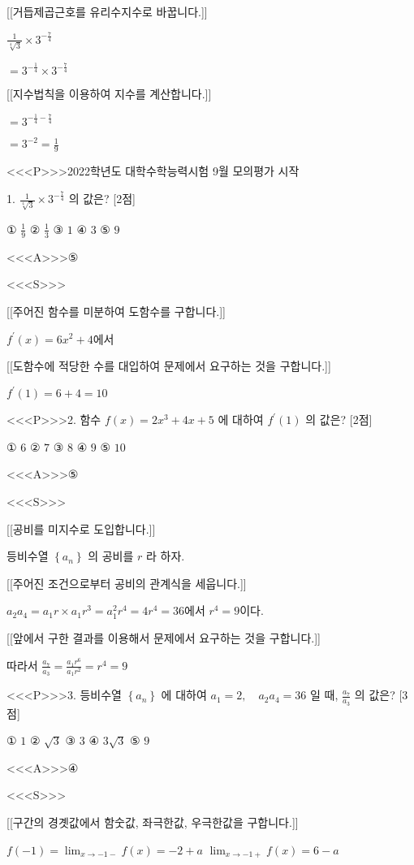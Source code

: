 \documentclass{oblivoir}
\begin{document}
[[거듭제곱근호를 유리수지수로 바꿉니다.]]

$\frac{1}{\sqrt[4]{3}} \times 3^{-\frac{7}{4}}$

$=3^{-\frac{1}{4}} \times 3^{-\frac{7}{4}}$

[[지수법칙을 이용하여 지수를 계산합니다.]]

$=3^{-\frac{1}{4}-\frac{7}{4}}$

$=3^{-2}=\frac{1}{9}$

<<<P>>>2022학년도 대학수학능력시험 9월 모의평가 시작

1. $\frac{1}{\sqrt[4]{3}} \times 3^{-\frac{7}{4}}$ 의 값은? [2점]

① $\frac{1}{9}$
② $\frac{1}{3}$
③ $1$
④ $3$
⑤ $9$


<<<A>>>⑤

<<<S>>>

[[주어진 함수를 미분하여 도함수를 구합니다.]]

$ f^{\prime}(x)=6 x^{2}+4$에서

[[도함수에 적당한 수를 대입하여 문제에서 요구하는 것을 구합니다.]]

$f^{\prime}(1)=6+4=10$


<<<P>>>2. 함수 $f(x)=2 x^{3}+4 x+5$ 에 대하여 $f^{\prime}(1)$ 의 값은? [2점]

① $6$
② $7$
③ $8$
④ $9$
⑤ $10$

<<<A>>>⑤

<<<S>>>

[[공비를 미지수로 도입합니다.]]

등비수열 $\left\{a_{n}\right\}$ 의 공비를 $r$ 라 하자.

[[주어진 조건으로부터 공비의 관계식을 세웁니다.]]

$a_{2} a_{4}=a_{1} r \times a_{1} r^{3}=a_{1}^{2} r^{4}=4 r^{4}=36$에서 $r^{4}=9$이다.

[[앞에서 구한 결과를 이용해서 문제에서 요구하는 것을 구합니다.]]

따라서 $\frac{a_{7}}{a_{3}}=\frac{a_{1} r^{6}}{a_{1} r^{2}}=r^{4}=9$


<<<P>>>3. 등비수열 $\left\{a_{n}\right\}$ 에 대하여 $a_{1}=2, \quad a_{2} a_{4}=36$ 일 때, $\frac{a_{7}}{a_{3}}$ 의 값은? [3점]

① $1$
② $\sqrt{3}$
③ $3$
④ $3 \sqrt{3}$
⑤ $9$

<<<A>>>④

<<<S>>>

[[구간의 경곗값에서 함숫값, 좌극한값, 우극한값을 구합니다.]]

$ f(-1)=\lim _{x \rightarrow-1-} f(x)=-2+a$
$\lim _{x \rightarrow-1+} f(x)=6-a$
\end{document}

